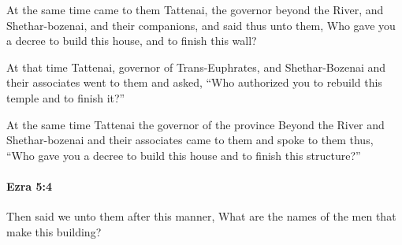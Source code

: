 			\begin{versebox}
					\item[BHS] 
					\item[LXX] 
					\item[ASV] At the same time came to them Tattenai, the governor beyond the River, and Shethar-bozenai, and their companions, and said thus unto them, Who gave you a decree to build this house, and to finish this wall?
					\item[NIV] At that time Tattenai, governor of Trans-Euphrates, and Shethar-Bozenai and their associates went to them and asked, “Who authorized you to rebuild this temple and to finish it?”
					\item[NRSV] At the same time Tattenai the governor of the province Beyond the River and Shethar-bozenai and their associates came to them and spoke to them thus, “Who gave you a decree to build this house and to finish this structure?”
			\end{versebox}

		\paragraph{Ezra 5:4} %
			\label{EZRA-5-4}

			Then said we unto them after this manner, What are the names of the men that make this building?

